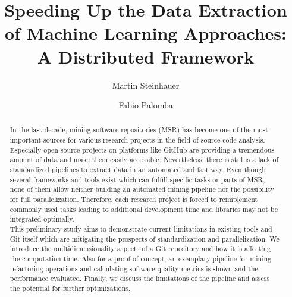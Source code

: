 \documentclass[sigconf,table,screen,xcdraw,review]{acmart}
\newcommand\iris{\textsc{Iris}\xspace}
\begin{document}
\title[Speeding Up the Data Extraction of Machine Learning Approaches]{Speeding Up the Data Extraction of Machine Learning Approaches: A Distributed Framework}

	\author{Martin Steinhauer}

	\author{Fabio Palomba}

\begin{abstract}
In the last decade, mining software repositories (MSR) has become one of the most important sources for various research projects in the field of source code analysis. Especially open-source projects on platforms like GitHub are providing a tremendous amount of data and make them easily accessible. Nevertheless, there is still is a lack of standardized pipelines to extract data in an automated and fast way. Even though several frameworks and tools exist which can fulfill specific tasks or parts of MSR, none of them allow neither building an automated mining pipeline nor the possibility for full parallelization. Therefore, each research project is forced to reimplement commonly used tasks leading to additional development time and libraries may not be integrated optimally. \\
This preliminary study aims to demonstrate current limitations in existing tools and Git itself which are mitigating the prospects of standardization and parallelization. We introduce the multidimensionality aspects of a Git repository and how it is affecting the computation time. Also for a proof of concept, an exemplary pipeline for mining refactoring operations and calculating software quality metrics is shown and the performance evaluated. Finally, we discuss the limitations of the pipeline and assess the potential for further optimizations.

\end{abstract}

\maketitle








\balance


\end{document}
